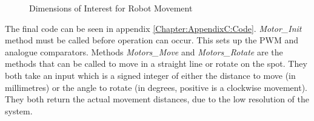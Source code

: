 \begin{figure}
\centering
{}
\caption{Dimensions of Interest for Robot Movement}
\label{fig:RobotBase_Annotated}
\end{figure}

 

The final code can be seen in appendix \ref{Chapter:AppendixC:Code}. \textit{Motor\_Init} method must be called before operation can occur. This sets up the PWM and analogue comparators. Methods \textit{Motors\_Move} and \textit{Motors\_Rotate} are the methods that can be called to move in a straight line or rotate on the spot. They both take an input which is a signed integer of either the distance to move (in millimetres) or the angle to rotate (in degrees, positive is a clockwise movement). They both return the actual movement distances, due to the low resolution of the system.


